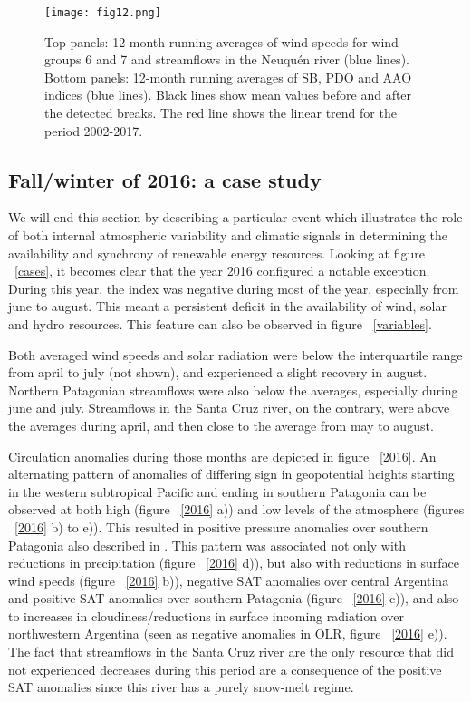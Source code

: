 \documentclass[AMA,Times1COL]{WileyNJDv5} %
\begin{document}
\begin{linenumbers}
\begin{figure}[hbpt]
	\centering
	\hspace*{0cm}   
	\texttt{[image: fig12.png]}
	\caption{\label{salto} Top panels: 12-month running averages of wind speeds for wind groups 6 and 7 and streamflows in the Neuquén river (blue lines). Bottom panels: 12-month running averages of SB, PDO and AAO indices (blue lines).
	Black lines show mean values before and after the detected breaks. The red line shows the linear trend for the period 2002-2017.}
\end{figure}

\subsection{Fall/winter of 2016: a case study}

We will end this section by describing a particular event which illustrates the role of both internal atmospheric variability and climatic signals in determining the availability and synchrony of renewable energy resources. Looking at figure ~\ref{cases}, it becomes clear that the year 2016 configured a notable exception. During this year, the index was negative during most of the year, especially from june to august. This meant a persistent deficit in the availability of wind, solar and hydro resources. This feature can also be observed in figure ~\ref{variables}.

Both averaged wind speeds and solar radiation were below the interquartile range from april to july (not shown), and experienced a slight recovery in august. Northern Patagonian streamflows were also below the averages, especially during june and july. Streamflows in the Santa Cruz river, on the contrary, were above the averages during april, and then close to the average from may to august.

Circulation anomalies during those months are depicted in figure ~\ref{2016}. An alternating pattern of anomalies of differing sign in geopotential heights starting in the western subtropical Pacific and ending in southern Patagonia can be observed at both high (figure ~\ref{2016} a)) and low levels of the atmosphere (figures ~\ref{2016} b) to e)). This resulted in positive pressure anomalies over southern Patagonia also described in \cite{garreaud2018record}. This pattern was associated not only with reductions in precipitation (figure ~\ref{2016} d)), but also with reductions in surface wind speeds (figure ~\ref{2016} b)), negative SAT anomalies over central Argentina and positive SAT anomalies over southern Patagonia (figure ~\ref{2016} c)), and also to increases in cloudiness/reductions in surface incoming radiation over northwestern Argentina (seen as negative anomalies in OLR, figure ~\ref{2016} e)). The fact that streamflows in the Santa Cruz river are the only resource that did not experienced decreases during this period are a consequence of the positive SAT anomalies since this river has a purely snow-melt regime.



\end{linenumbers}
\end{document}
